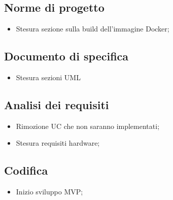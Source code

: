 \subsection{Norme di progetto}
\begin{itemize}
    \item Stesura sezione sulla build dell'immagine Docker;
\end{itemize}

\subsection{Documento di specifica}
\begin{itemize}
    \item Stesura sezioni UML
\end{itemize}

\subsection{Analisi dei requisiti}
\begin{itemize}
    \item Rimozione UC che non saranno implementati;
    \item Stesura requisiti hardware;
\end{itemize}

\subsection{Codifica}
\begin{itemize}
    \item Inizio sviluppo MVP;
\end{itemize}

